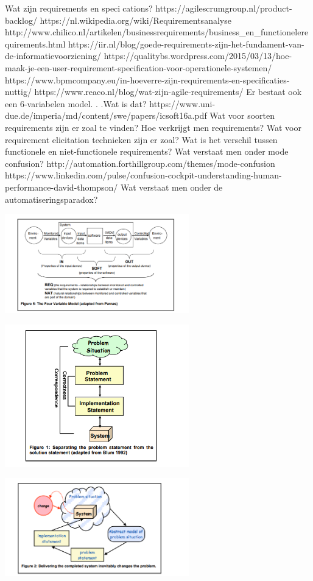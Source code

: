 \documentclass{article}
\begin{document}
	Wat zijn requirements en specications?
	https://agilescrumgroup.nl/product-backlog/
	https://nl.wikipedia.org/wiki/Requirementsanalyse
	http://www.chilico.nl/artikelen/businessrequirements/business_en_functionelerequirements.html
	https://iir.nl/blog/goede-requirements-zijn-het-fundament-van-de-informatievoorziening/
	https://qualitybs.wordpress.com/2015/03/13/hoe-maak-je-een-user-requirement-specification-voor-operationele-systemen/
	https://www.bpmcompany.eu/in-hoeverre-zijn-requirements-en-specificaties-nuttig/
	https://www.reaco.nl/blog/wat-zijn-agile-requirements/
	Er bestaat ook een 6-variabelen model. . .Wat is dat?
	https://www.uni-due.de/imperia/md/content/swe/papers/icsoft16a.pdf
	Wat voor soorten requirements zijn er zoal te vinden?
	Hoe verkrijgt men requirements?
	Wat voor requirement elicitation technieken zijn er zoal?
	Wat is het verschil tussen functionele en niet-functionele
	requirements?
	Wat verstaat men onder mode confusion?
	http://automation.forthillgroup.com/themes/mode-confusion
	https://www.linkedin.com/pulse/confusion-cockpit-understanding-human-performance-david-thompson/
	Wat verstaat men onder de automatiseringsparadox?
	
		\includegraphics[width=8cm]{4varparnas.png}
		
				\includegraphics[width=8cm]{requirement.png}
		
			\includegraphics[width=8cm]{oplossing_easterbrook.png}
			
\end{document}
